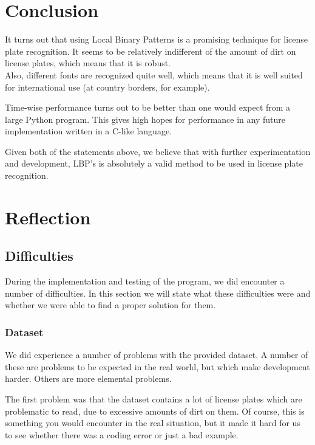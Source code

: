 \documentclass[a4paper]{article}
\begin{document}
\section{Conclusion}

It turns out that using Local Binary Patterns is a promising technique for
license plate recognition. It seems to be relatively indifferent of the amount
of dirt on license plates, which means that it is robust. \\
Also, different fonts are recognized quite well, which means that it is well
suited for international use (at country borders, for example).

Time-wise performance turns out to be better than one would expect from a large
Python program. This gives high hopes for performance in any future
implementation written in a C-like language.

Given both of the statements above, we believe that with further
experimentation and development, LBP's is absolutely a valid method to be used
in license plate recognition.

\section{Reflection}

\subsection{Difficulties}

During the implementation and testing of the program, we did encounter a
number of difficulties. In this section we will state what these difficulties
were and whether we were able to find a proper solution for them.

\subsubsection*{Dataset}

We did experience a number of problems with the provided dataset. A number of
these are problems to be expected in the real world, but which make development
harder. Others are more elemental problems.

The first problem was that the dataset contains a lot of license plates which
are problematic to read, due to excessive amounts of dirt on them. Of course,
this is something you would encounter in the real situation, but it made it
hard for us to see whether there was a coding error or just a bad example.
\end{document}
